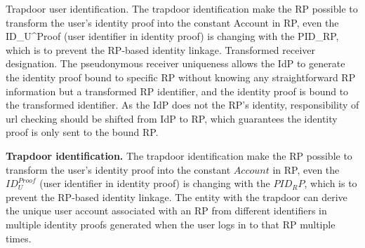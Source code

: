 {\color{red} 
Trapdoor user identification. The trapdoor identification make the RP possible to transform the user's identity proof into the constant Account in RP, even the ID_U^Proof (user identifier in identity proof) is changing with the PID_RP, which is to prevent the RP-based identity linkage.
Transformed receiver designation. The pseudonymous receiver uniqueness allows the IdP to generate the identity proof bound to specific RP without knowing any straightforward RP information but a transformed RP identifier, and the identity proof is bound to the transformed identifier. As the IdP does not the RP’s identity, responsibility of url checking should be shifted from IdP to RP, which guarantees the identity proof is only sent to the bound RP.
}

\vspace{1mm}\noindent \textbf{Trapdoor identification.} 
The trapdoor identification make the RP possible to transform the user's identity proof into the constant $Account$ in RP, even the $ID_U^{Proof}$ (user identifier in identity proof) is changing with the $PID_RP$, which is to prevent the RP-based identity linkage.
The entity with the trapdoor can derive the unique user account associated with an RP from different identifiers in multiple identity proofs generated when the user logs in to that RP multiple times.

